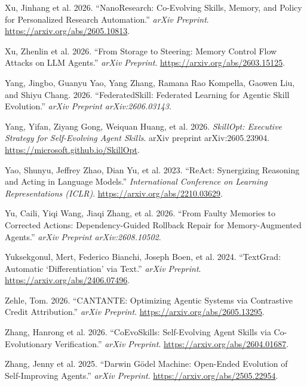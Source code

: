 \documentclass[
]{article}
\newlength{\cslhangindent}
\newenvironment{CSLReferences}[2] %
 {\begin{list}{}{%
  \setlength{\itemindent}{0pt}
  \setlength{\leftmargin}{0pt}
  \setlength{\parsep}{0pt}
  \ifodd #1
   \setlength{\leftmargin}{\cslhangindent}
   \setlength{\itemindent}{-1\cslhangindent}
  \fi
  \setlength{\itemsep}{#2\baselineskip}}}
 {\end{list}}
\begin{document}
\begin{CSLReferences}{1}{1}
{Xu, Jinhang et al.} 2026. {``{NanoResearch}: Co-Evolving Skills,
Memory, and Policy for Personalized Research Automation.''} \emph{arXiv
Preprint}. \url{https://arxiv.org/abs/2605.10813}.

{Xu, Zhenlin et al.} 2026. {``From Storage to Steering: Memory Control
Flow Attacks on {LLM} Agents.''} \emph{arXiv Preprint}.
\url{https://arxiv.org/abs/2603.15125}.

Yang, Jingbo, Guanyu Yao, Yang Zhang, Ramana Rao Kompella, Gaowen Liu,
and Shiyu Chang. 2026. {``{FederatedSkill}: Federated Learning for
Agentic Skill Evolution.''} \emph{arXiv Preprint arXiv:2606.03143}.

Yang, Yifan, Ziyang Gong, Weiquan Huang, et al. 2026. \emph{{SkillOpt}:
Executive Strategy for Self-Evolving Agent Skills}. arXiv preprint
arXiv:2605.23904. \url{https://microsoft.github.io/SkillOpt}.

Yao, Shunyu, Jeffrey Zhao, Dian Yu, et al. 2023. {``{ReAct}: Synergizing
Reasoning and Acting in Language Models.''} \emph{International
Conference on Learning Representations (ICLR)}.
\url{https://arxiv.org/abs/2210.03629}.

Yu, Caili, Yiqi Wang, Jiaqi Zhang, et al. 2026. {``From Faulty Memories
to Corrected Actions: Dependency-Guided Rollback Repair for
Memory-Augmented Agents.''} \emph{arXiv Preprint arXiv:2608.10502}.

Yuksekgonul, Mert, Federico Bianchi, Joseph Boen, et al. 2024.
{``{TextGrad}: Automatic {`Differentiation'} via Text.''} \emph{arXiv
Preprint}. \url{https://arxiv.org/abs/2406.07496}.

Zehle, Tom. 2026. {``{CANTANTE}: Optimizing Agentic Systems via
Contrastive Credit Attribution.''} \emph{arXiv Preprint}.
\url{https://arxiv.org/abs/2605.13295}.

{Zhang, Hanrong et al.} 2026. {``{CoEvoSkills}: Self-Evolving Agent
Skills via Co-Evolutionary Verification.''} \emph{arXiv Preprint}.
\url{https://arxiv.org/abs/2604.01687}.

{Zhang, Jenny et al.} 2025. {``Darwin {Gödel} Machine: Open-Ended
Evolution of Self-Improving Agents.''} \emph{arXiv Preprint}.
\url{https://arxiv.org/abs/2505.22954}.


\end{CSLReferences}
\end{document}

